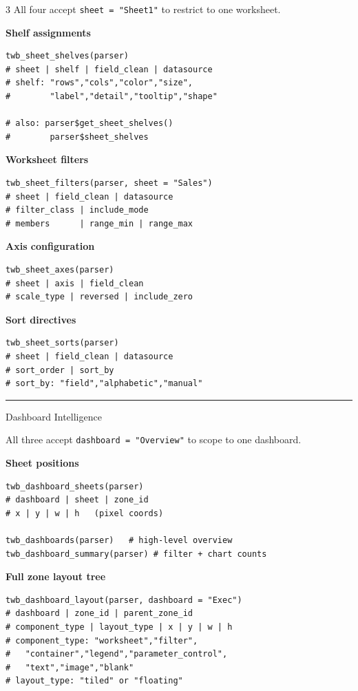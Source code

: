 \documentclass[10pt,landscape]{article}
\newcommand{\opt}[1]{\textcolor{twbOrange}{\texttt{#1}}}
\newcommand{\sep}{\vspace{1pt}\hrule\vspace{2pt}}
\begin{document}
\begin{multicols}{3}
All four accept \opt{sheet = "Sheet1"} to restrict to one worksheet.

\textbf{Shelf assignments}

\begin{lstlisting}
twb_sheet_shelves(parser)
# sheet | shelf | field_clean | datasource
# shelf: "rows","cols","color","size",
#        "label","detail","tooltip","shape"

# also: parser$get_sheet_shelves()
#        parser$sheet_shelves
\end{lstlisting}

\textbf{Worksheet filters}

\begin{lstlisting}
twb_sheet_filters(parser, sheet = "Sales")
# sheet | field_clean | datasource
# filter_class | include_mode
# members      | range_min | range_max
\end{lstlisting}

\textbf{Axis configuration}

\begin{lstlisting}
twb_sheet_axes(parser)
# sheet | axis | field_clean
# scale_type | reversed | include_zero
\end{lstlisting}

\textbf{Sort directives}

\begin{lstlisting}
twb_sheet_sorts(parser)
# sheet | field_clean | datasource
# sort_order | sort_by
# sort_by: "field","alphabetic","manual"
\end{lstlisting}

\sep

\begin{secbox}[twbPurple]{Dashboard Intelligence}
\end{secbox}

All three accept \opt{dashboard = "Overview"} to scope to one dashboard.

\textbf{Sheet positions}

\begin{lstlisting}
twb_dashboard_sheets(parser)
# dashboard | sheet | zone_id
# x | y | w | h   (pixel coords)

twb_dashboards(parser)   # high-level overview
twb_dashboard_summary(parser) # filter + chart counts
\end{lstlisting}

\textbf{Full zone layout tree}

\begin{lstlisting}
twb_dashboard_layout(parser, dashboard = "Exec")
# dashboard | zone_id | parent_zone_id
# component_type | layout_type | x | y | w | h
# component_type: "worksheet","filter",
#   "container","legend","parameter_control",
#   "text","image","blank"
# layout_type: "tiled" or "floating"
\end{lstlisting}


\end{multicols}
\end{document}
